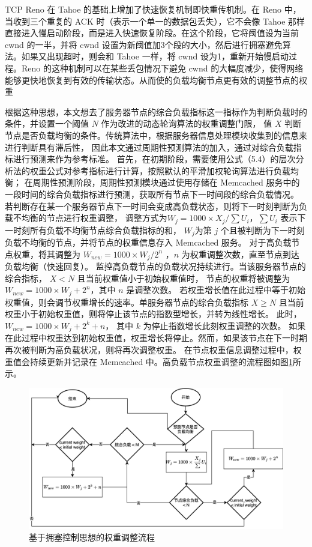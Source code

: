 TCP Reno 在 Tahoe 的基础上增加了快速恢复机制即快重传机制。在 Reno 中，当收到三个重复的 ACK 时（表示一个单一的数据包丢失），它不会像 Tahoe 那样直接进入慢启动阶段，而是进入快速恢复阶段。在这个阶段，它将阈值设为当前 cwnd 的一半，并将 cwnd 设置为新阈值加3个段的大小，然后进行拥塞避免算法。如果又出现超时，则会和 Tahoe 一样，将 cwnd 设为1，重新开始慢启动过程。Reno 的这种机制可以在某些丢包情况下避免 cwnd 的大幅度减少，使得网络能够更快地恢复到有效的传输状态。从而使的负载均衡节点更有效的调整节点的权重

根据这种思想，本文想去了服务器节点的综合负载指标这一指标作为判断负载时的条件，并设置一个阈值 $N$ 作为改进的动态轮询算法的权重调整门限，
值 $X$ 判断节点是否负载均衡的条件。传统算法中，根据服务器信息处理模块收集到的信息来进行判断具有滞后性，
因此本文通过周期性预测算法的加入，通过对综合负载指标进行预测来作为参考标准。
首先，在初期阶段，需要使用公式（5.4）的层次分析法的权重公式对参考指标进行计算，按照默认的平滑加权轮询算法进行负载均衡；
在周期性预测阶段，周期性预测模块通过使用存储在 Memcached 服务中的一段时间的综合负载指标进行预测，获取所有节点下一时间段的综合负载情况。
若判断存在某一个服务器节点下一时间会变成高负载状态，则将下一时刻判断为负载不均衡的节点进行权重调整，
调整方式为$W_j = 1000 \times X_{j} / \sum U_{i}$，$\sum U_{i}$ 表示下一时刻所有负载不均衡节点综合负载指标的和，
$W_j$为第 $j$ 个且被判断为下一时刻负载不均衡的节点，并将节点的权重信息存入 Memcached 服务。
对于高负载节点权重，将其调整为 $W_{new} = 1000 \times W_{j} / 2^{n}$ ，$n$ 为权重调整次数，直至节点到达负载均衡（快速回复）。
监控高负载节点的负载状况持续进行。当该服务器节点的综合指标， $X < N$ 且当前权重值小于初始权重值时，
节点的权重将被调整为 $W_{new} = 1000 \times W_{j} + 2^n$，其中 $n$ 是调整次数。
若权重增长值在此过程中等于初始权重值，则会调节权重增长的速率。单服务器节点的综合负载指标 $X \ge N$ 且当前权重小于初始权重值，则将停止该节点的指数型增长，并转为线性增长。
此时， $W_{new} = 1000 \times W_{j} + 2^k + n$， 其中 $k$ 为停止指数增长此刻权重调整的次数。
如果在此过程中权重达到初始权重值，权重增长将停止。然而，如果该节点在下一时期再次被判断为高负载状况，则将再次调整权重。
在节点权重信息调整过程中，权重值会持续更新并记录在 Memcached 中。高负载节点权重调整的流程图如图\ref{contral_weight}所示。

\begin{figure}[htbp]
	\centering
	\includegraphics[width=\textwidth]{figures/change_weight.png}
	\caption{基于拥塞控制思想的权重调整流程}
	\label{contral_weight}
\end{figure}

